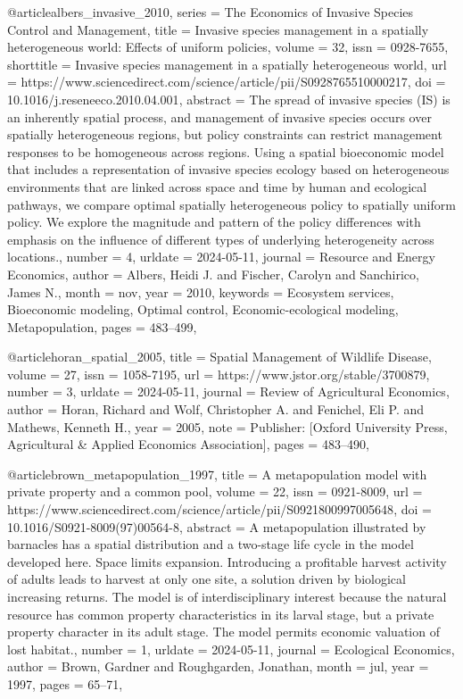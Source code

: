 {{{{@article{albers_invasive_2010,
	series = {The {Economics} of {Invasive} {Species} {Control} and {Management}},
	title = {Invasive species management in a spatially heterogeneous world: {Effects} of uniform policies},
	volume = {32},
	issn = {0928-7655},
	shorttitle = {Invasive species management in a spatially heterogeneous world},
	url = {https://www.sciencedirect.com/science/article/pii/S0928765510000217},
	doi = {10.1016/j.reseneeco.2010.04.001},
	abstract = {The spread of invasive species (IS) is an inherently spatial process, and management of invasive species occurs over spatially heterogeneous regions, but policy constraints can restrict management responses to be homogeneous across regions. Using a spatial bioeconomic model that includes a representation of invasive species ecology based on heterogeneous environments that are linked across space and time by human and ecological pathways, we compare optimal spatially heterogeneous policy to spatially uniform policy. We explore the magnitude and pattern of the policy differences with emphasis on the influence of different types of underlying heterogeneity across locations.},
	number = {4},
	urldate = {2024-05-11},
	journal = {Resource and Energy Economics},
	author = {Albers, Heidi J. and Fischer, Carolyn and Sanchirico, James N.},
	month = nov,
	year = {2010},
	keywords = {Ecosystem services, Bioeconomic modeling, Optimal control, Economic-ecological modeling, Metapopulation},
	pages = {483--499},
}

@article{horan_spatial_2005,
	title = {Spatial {Management} of {Wildlife} {Disease}},
	volume = {27},
	issn = {1058-7195},
	url = {https://www.jstor.org/stable/3700879},
	number = {3},
	urldate = {2024-05-11},
	journal = {Review of Agricultural Economics},
	author = {Horan, Richard and Wolf, Christopher A. and Fenichel, Eli P. and Mathews, Kenneth H.},
	year = {2005},
	note = {Publisher: [Oxford University Press, Agricultural \& Applied Economics Association]},
	pages = {483--490},
}

@article{brown_metapopulation_1997,
	title = {A metapopulation model with private property and a common pool},
	volume = {22},
	issn = {0921-8009},
	url = {https://www.sciencedirect.com/science/article/pii/S0921800997005648},
	doi = {10.1016/S0921-8009(97)00564-8},
	abstract = {A metapopulation illustrated by barnacles has a spatial distribution and a two-stage life cycle in the model developed here. Space limits expansion. Introducing a profitable harvest activity of adults leads to harvest at only one site, a solution driven by biological increasing returns. The model is of interdisciplinary interest because the natural resource has common property characteristics in its larval stage, but a private property character in its adult stage. The model permits economic valuation of lost habitat.},
	number = {1},
	urldate = {2024-05-11},
	journal = {Ecological Economics},
	author = {Brown, Gardner and Roughgarden, Jonathan},
	month = jul,
	year = {1997},
	pages = {65--71},
}

}}}}
